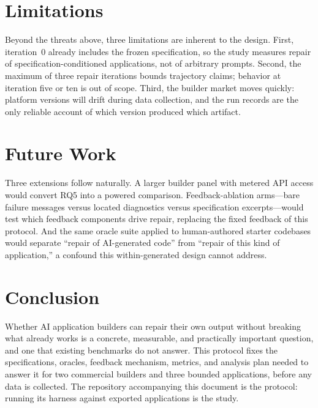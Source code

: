 \section{Limitations}

Beyond the threats above, three limitations are inherent to the design. First,
iteration~0 already includes the frozen specification, so the study measures repair
of specification-conditioned applications, not of arbitrary prompts. Second, the
maximum of three repair iterations bounds trajectory claims; behavior at iteration
five or ten is out of scope. Third, the builder market moves quickly: platform
versions will drift during data collection, and the run records are the only
reliable account of which version produced which artifact.

\section{Future Work}

Three extensions follow naturally. A larger builder panel with metered API access
would convert RQ5 into a powered comparison. Feedback-ablation arms---bare failure
messages versus located diagnostics versus specification excerpts---would test which
feedback components drive repair, replacing the fixed feedback of this protocol. And
the same oracle suite applied to human-authored starter codebases would separate
``repair of AI-generated code'' from ``repair of this kind of application,'' a
confound this within-generated design cannot address.

\section{Conclusion}

Whether AI application builders can repair their own output without breaking what
already works is a concrete, measurable, and practically important question, and one
that existing benchmarks do not answer. This protocol fixes the specifications,
oracles, feedback mechanism, metrics, and analysis plan needed to answer it for two
commercial builders and three bounded applications, before any data is collected.
The repository accompanying this document is the protocol: running its harness
against exported applications is the study.
